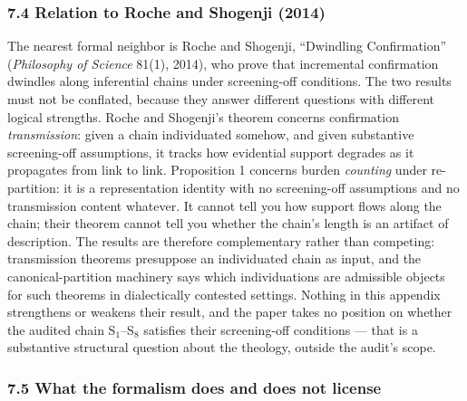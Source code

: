 \subsubsection{7.4 Relation to Roche and Shogenji (2014)}\label{relation-to-roche-and-shogenji-2014}

The nearest formal neighbor is Roche and Shogenji, ``Dwindling Confirmation'' (\emph{Philosophy of Science} 81(1), 2014), who prove that incremental confirmation dwindles along inferential chains under screening-off conditions. The two results must not be conflated, because they answer different questions with different logical strengths. Roche and Shogenji's theorem concerns confirmation \emph{transmission}: given a chain individuated somehow, and given substantive screening-off assumptions, it tracks how evidential support degrades as it propagates from link to link. Proposition 1 concerns burden \emph{counting} under re-partition: it is a representation identity with no screening-off assumptions and no transmission content whatever. It cannot tell you how support flows along the chain; their theorem cannot tell you whether the chain's length is an artifact of description. The results are therefore complementary rather than competing: transmission theorems presuppose an individuated chain as input, and the canonical-partition machinery says which individuations are admissible objects for such theorems in dialectically contested settings. Nothing in this appendix strengthens or weakens their result, and the paper takes no position on whether the audited chain S$_1$--S$_8$ satisfies their screening-off conditions --- that is a substantive structural question about the theology, outside the audit's scope.

\subsubsection{7.5 What the formalism does and does not license}\label{what-the-formalism-does-and-does-not-license}

